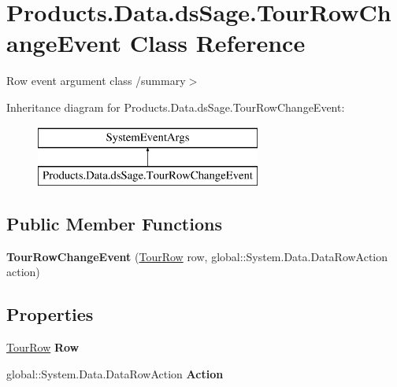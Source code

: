 \hypertarget{class_products_1_1_data_1_1ds_sage_1_1_tour_row_change_event}{}\section{Products.\+Data.\+ds\+Sage.\+Tour\+Row\+Change\+Event Class Reference}
\label{class_products_1_1_data_1_1ds_sage_1_1_tour_row_change_event}


Row event argument class /summary$>$  


Inheritance diagram for Products.\+Data.\+ds\+Sage.\+Tour\+Row\+Change\+Event\+:\begin{figure}[H]
\begin{center}
\leavevmode
\includegraphics[height=2.000000cm]{class_products_1_1_data_1_1ds_sage_1_1_tour_row_change_event}
\end{center}
\end{figure}
\subsection*{Public Member Functions}
\begin{DoxyCompactItemize}
\item 
{\bfseries Tour\+Row\+Change\+Event} (\hyperlink{class_products_1_1_data_1_1ds_sage_1_1_tour_row}{Tour\+Row} row, global\+::\+System.\+Data.\+Data\+Row\+Action action)\hypertarget{class_products_1_1_data_1_1ds_sage_1_1_tour_row_change_event_ae852193244467fbae69d88d371473dd5}{}\label{class_products_1_1_data_1_1ds_sage_1_1_tour_row_change_event_ae852193244467fbae69d88d371473dd5}

\end{DoxyCompactItemize}
\subsection*{Properties}
\begin{DoxyCompactItemize}
\item 
\hyperlink{class_products_1_1_data_1_1ds_sage_1_1_tour_row}{Tour\+Row} {\bfseries Row}\hypertarget{class_products_1_1_data_1_1ds_sage_1_1_tour_row_change_event_a13ce26453531f2bf553d9fad18f9c150}{}\label{class_products_1_1_data_1_1ds_sage_1_1_tour_row_change_event_a13ce26453531f2bf553d9fad18f9c150}

\item 
global\+::\+System.\+Data.\+Data\+Row\+Action {\bfseries Action}\hypertarget{class_products_1_1_data_1_1ds_sage_1_1_tour_row_change_event_af48375c90a07af5190881a2e4afae2f5}{}\label{class_products_1_1_data_1_1ds_sage_1_1_tour_row_change_event_af48375c90a07af5190881a2e4afae2f5}

\end{DoxyCompactItemize}


